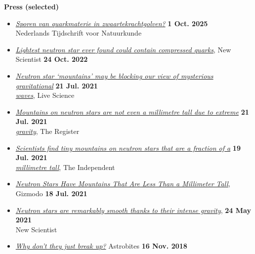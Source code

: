 \documentclass[%
    margin,
    line,
    11pt,
]{res}
\begin{document}
\begin{resume}
\textbf{Press (selected)}
\vspace*{0.05in}
\begin{itemize}
    \item[]
    \href{https://www.ntvn.nl/2025/10/sporen-van-quarkmaterie-zwaartekrachtgolven/}%
    {\textit{Sporen van quarkmaterie in zwaartekrachtgolven?}}
    \hfill \textbf{1 Oct. 2025} \\
    Nederlands Tijdschrift voor Natuurkunde
    \item[]
    \href{https://www.newscientist.com/article/2343788-lightest-neutron-star-ever-found-could-contain-compressed-quarks/}%
    {\textit{Lightest neutron star ever found could contain compressed quarks}},
    New Scientist \hfill \textbf{24 Oct. 2022}
    \item[]
    \href{https://www.livescience.com/millimeter-tall-neutron-star-mountains.html}%
    {\textit{Neutron star `mountains' may be blocking our view of mysterious gravitational}}
    \hfill \textbf{21 Jul. 2021} \\
    \href{https://www.livescience.com/millimeter-tall-neutron-star-mountains.html}%
    {\textit{waves}}, Live Science
    \item[]
    \href{https://www.theregister.com/2021/07/21/mountain_neutron_stars/}%
    {\textit{Mountains on neutron stars are not even a millimetre tall due to extreme}}
    \hfill \textbf{21 Jul. 2021} \\
    \href{https://www.theregister.com/2021/07/21/mountain_neutron_stars/}%
    {\textit{gravity}}, The Register
    \item[]
    \href{https://www.independent.co.uk/space/neutron-stars-mountains-ligo-virgo-b1886426.html}%
    {\textit{Scientists find tiny mountains on neutron stars that are a fraction of a}}
    \hfill \textbf{19 Jul. 2021} \\
    \href{https://www.independent.co.uk/space/neutron-stars-mountains-ligo-virgo-b1886426.html}%
    {\textit{millimetre tall}}, The Independent
    \item[]
    \href{https://gizmodo.com/neutron-stars-have-mountains-that-are-less-than-a-milli-1847309049}%
    {\textit{Neutron Stars Have Mountains That Are Less Than a Millimeter Tall}},
    Gizmodo \hfill \textbf{18 Jul. 2021}
    \item[]
    \href{https://www.newscientist.com/article/2278363-neutron-stars-are-remarkably-smooth-thanks-to-their-intense-gravity/}%
    {\textit{Neutron stars are remarkably smooth thanks to their intense gravity}},
    \hfill \textbf{24 May 2021} \\
    New Scientist
    \item[]
    \href{https://astrobites.org/2018/11/16/ns_breakup/}%
    {\textit{Why don't they just break up?}}
    Astrobites \hfill \textbf{16 Nov. 2018}
\end{itemize}


\end{resume}
\end{document}

